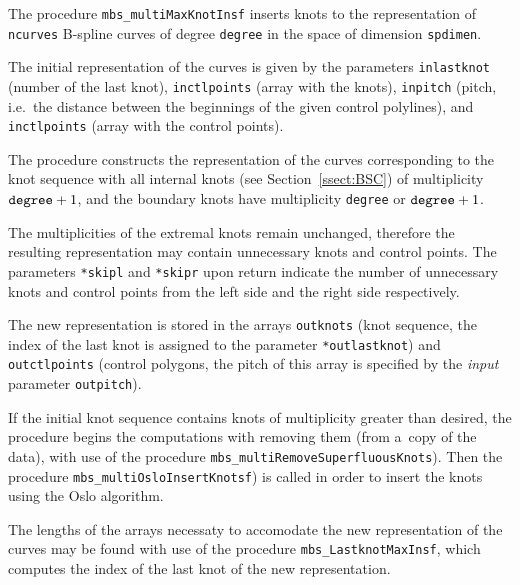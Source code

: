 \vspace{\bigskipamount}
\begin{sloppypar}
The procedure \texttt{mbs\_multiMaxKnotInsf} inserts knots to the
representation of \texttt{ncurves} B-spline curves of degree \texttt{degree}
in the space of dimension \texttt{spdimen}.

The initial representation of the curves is given by the parameters
\texttt{inlastknot} (number of the last knot),
\texttt{inctlpoints} (array with the knots),
\texttt{inpitch} (pitch, i.e.\ the distance between the beginnings of
the given control polylines),
and \texttt{inctlpoints} (array with the control points).

The procedure constructs the representation of the curves corresponding
to the knot sequence with all internal knots (see Section~\ref{ssect:BSC})
of multiplicity $\mathord{\makebox{\texttt{degree}}}+1$, and the
boundary knots have multiplicity \texttt{degree} or
$\mathord{\makebox{\texttt{degree}}}+1$.

The multiplicities of the extremal knots remain unchanged, therefore
the resulting representation may contain unnecessary knots and control
points. The parameters \texttt{*skipl} and \texttt{*skipr} upon return
indicate the number of unnecessary knots and control points
from the left side and the right side respectively.

The new representation is stored in the arrays
\texttt{outknots} (knot sequence, the index of the last knot is assigned
to the parameter \texttt{*outlastknot}) and \texttt{outctlpoints}
(control polygons, the pitch of this array is specified by the
\emph{input} parameter \texttt{outpitch}).

If the initial knot sequence contains knots of multiplicity greater than
desired, the procedure begins the computations with removing them
(from a~copy of the data), with use of the procedure
\texttt{mbs\_multiRemoveSuperfluousKnots}).
Then the procedure \texttt{mbs\_multiOsloInsertKnotsf}) is called
in order to insert the knots using the Oslo algorithm.

The lengths of the arrays necessaty to accomodate the new representation
of the curves may be found with use of the procedure
\texttt{mbs\_LastknotMaxInsf}, which computes the index of the last knot
of the new representation.
\end{sloppypar}


